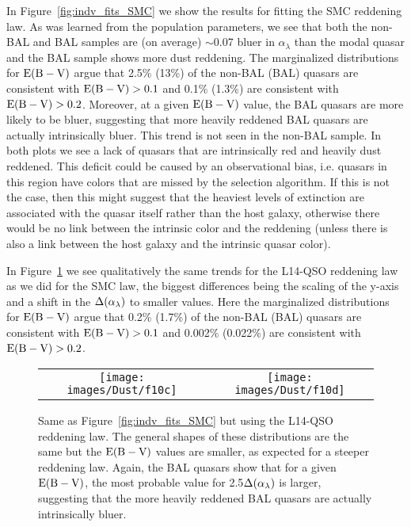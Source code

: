 In Figure~\ref{fig:indv_fits_SMC} we show the results for fitting the SMC reddening law.  As was learned from the population parameters, we see that both the non-BAL and BAL samples are (on average) $\sim$0.07 bluer in $\alpha_{\lambda}$ than the modal quasar and the BAL sample shows more dust reddening.  The marginalized distributions for $\ebv$ argue that 2.5\% (13\%) of the non-BAL (BAL) quasars are consistent with ${\rm E(B-V)}>0.1$ and 0.1\% (1.3\%) are consistent with ${\rm E(B-V)}>0.2$.
Moreover, at a given $\ebv$ value, the BAL quasars are more likely to be bluer, suggesting that more heavily reddened BAL quasars are actually intrinsically bluer.  This trend is not seen in the non-BAL sample.  In both plots we see a lack of quasars that are intrinsically red and heavily dust reddened.  This deficit could be caused by an observational bias, i.e. quasars in this region have colors that are missed by the selection algorithm.  If this is not the case, then this might suggest that the heaviest levels of extinction are associated with the quasar itself rather than the host galaxy, otherwise there would be no link between the intrinsic color and the reddening (unless there is also a link between the host galaxy and the intrinsic quasar color).

In Figure~\ref{fig:indv_fits_L14} we see qualitatively the same trends for the L14-QSO reddening law as we did for the SMC law, the biggest differences being the scaling of the y-axis and a shift in the $\dal$ to smaller values. Here the marginalized distributions for $\ebv$ argue that 0.2\% (1.7\%) of the non-BAL (BAL) quasars are consistent with ${\rm E(B-V)}>0.1$ and 0.002\% (0.022\%) are consistent with ${\rm E(B-V)}>0.2$.

\begin{figure*}[t]
\begin{center}
\begin{tabular}{cc}
\texttt{[image: images/Dust/f10c]} & \texttt{[image: images/Dust/f10d]} 
\end{tabular}
\caption[Joint probability distribution of 2.5$\dal$ and $\ebv$]{\label{fig:indv_fits_L14} Same as Figure~\ref{fig:indv_fits_SMC} but using the L14-QSO reddening law.  The general shapes of these distributions are the same but the $\ebv$ values are smaller, as expected for a steeper reddening law.  Again, the BAL quasars show that for a given $\ebv$, the most probable value for 2.5$\dal$ is larger, suggesting that the more heavily reddened BAL quasars are actually intrinsically bluer.}
\end{center}
\end{figure*}

